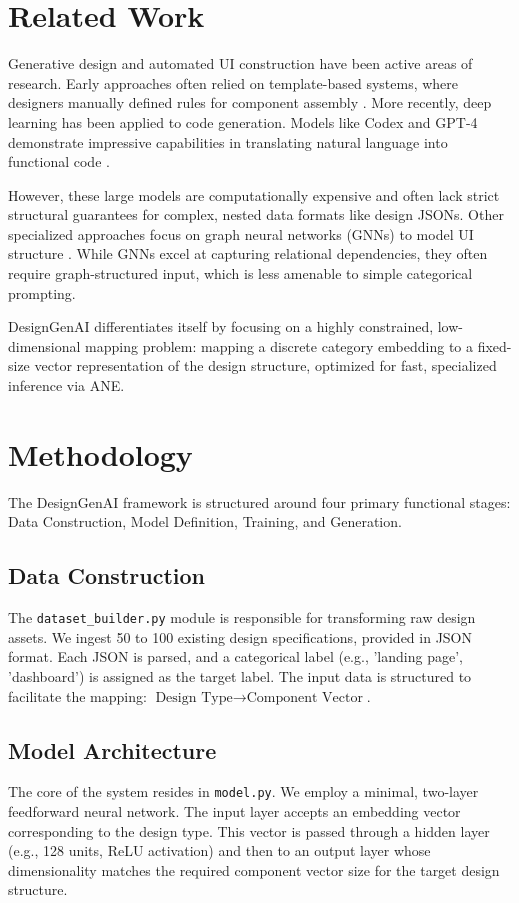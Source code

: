 \documentclass[11pt,a4paper]{article}
\begin{document}
\section{Related Work}
Generative design and automated UI construction have been active areas of research. Early approaches often relied on template-based systems, where designers manually defined rules for component assembly \cite{template_systems}. More recently, deep learning has been applied to code generation. Models like Codex and GPT-4 demonstrate impressive capabilities in translating natural language into functional code \cite{llm_code}.

However, these large models are computationally expensive and often lack strict structural guarantees for complex, nested data formats like design JSONs. Other specialized approaches focus on graph neural networks (GNNs) to model UI structure \cite{gnn_ui}. While GNNs excel at capturing relational dependencies, they often require graph-structured input, which is less amenable to simple categorical prompting.

DesignGenAI differentiates itself by focusing on a highly constrained, low-dimensional mapping problem: mapping a discrete category embedding to a fixed-size vector representation of the design structure, optimized for fast, specialized inference via ANE.

\section{Methodology}
The DesignGenAI framework is structured around four primary functional stages: Data Construction, Model Definition, Training, and Generation.

\subsection{Data Construction}
The \texttt{dataset\_builder.py} module is responsible for transforming raw design assets. We ingest 50 to 100 existing design specifications, provided in JSON format. Each JSON is parsed, and a categorical label (e.g., 'landing page', 'dashboard') is assigned as the target label. The input data is structured to facilitate the mapping: $\text{Design Type} \rightarrow \text{Component Vector}$.

\subsection{Model Architecture}
The core of the system resides in \texttt{model.py}. We employ a minimal, two-layer feedforward neural network. The input layer accepts an embedding vector corresponding to the design type. This vector is passed through a hidden layer (e.g., 128 units, ReLU activation) and then to an output layer whose dimensionality matches the required component vector size for the target design structure.
\end{document}

